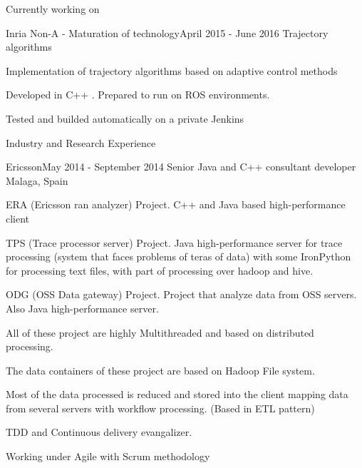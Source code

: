 \documentclass{resume} %
\begin{document}
\begin{rSection}{Currently working on}
	\begin{rSubsection}{Inria Non-A - Maturation of technology}{April 2015 - June 2016 }{Trajectory algorithms}
		\item 
		\item Implementation of trajectory algorithms based on adaptive control methods
		\item Developed in C++ . Prepared to run on ROS environments. 
		\item Tested and builded automatically on a private Jenkins
	\end{rSubsection}




\end{rSection}


\begin{rSection}{Industry and Research Experience}

\begin{rSubsection}{Ericsson}{May 2014 - September 2014 }{ Senior Java and C++ consultant developer }{Malaga, Spain}
\item ERA (Ericsson ran analyzer) Project. C++ and Java based high-performance client
\item TPS (Trace processor server) Project. Java high-performance server for trace processing (system that faces problems of teras of data) with some IronPython for processing text files, with part of processing over hadoop and hive.
\item ODG (OSS Data gateway) Project. Project that analyze data from OSS servers. Also Java high-performance server. 
\item All of these project are highly Multithreaded and based on distributed processing. 
\item The data containers of these project are based on Hadoop File system. 
\item Most of the data processed is reduced and stored into the client mapping data from several servers with workflow processing. (Based in ETL pattern)
\item TDD and Continuous delivery evangalizer.
\item Working under Agile with Scrum methodology
\end{rSubsection}



\end{rSection}
\end{document}
